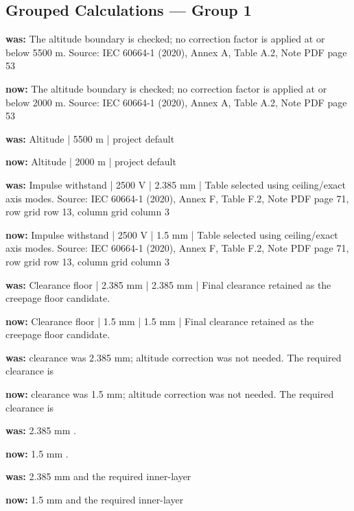 \documentclass[10pt]{article}
\begin{document}
\subsection*{Grouped Calculations — Group 1}
\textbf{was:} The altitude boundary is checked; no correction factor is applied at or below 5500 m. Source: IEC 60664-1 (2020), Annex A, Table A.2, Note PDF page 53\par
\textbf{now:} The altitude boundary is checked; no correction factor is applied at or below 2000 m. Source: IEC 60664-1 (2020), Annex A, Table A.2, Note PDF page 53\par
\textbf{was:} Altitude | 5500 m | project default\par
\textbf{now:} Altitude | 2000 m | project default\par
\textbf{was:} Impulse withstand | 2500 V | 2.385 mm | Table selected using ceiling/exact axis modes. Source: IEC 60664-1 (2020), Annex F, Table F.2, Note PDF page 71, row grid row 13, column grid column 3\par
\textbf{now:} Impulse withstand | 2500 V | 1.5 mm | Table selected using ceiling/exact axis modes. Source: IEC 60664-1 (2020), Annex F, Table F.2, Note PDF page 71, row grid row 13, column grid column 3\par
\textbf{was:} Clearance floor | 2.385 mm | 2.385 mm | Final clearance retained as the creepage floor candidate.\par
\textbf{now:} Clearance floor | 1.5 mm | 1.5 mm | Final clearance retained as the creepage floor candidate.\par
\textbf{was:} clearance was 2.385 mm; altitude correction was not needed. The required clearance is\par
\textbf{now:} clearance was 1.5 mm; altitude correction was not needed. The required clearance is\par
\textbf{was:} 2.385 mm .\par
\textbf{now:} 1.5 mm .\par
\textbf{was:} 2.385 mm and the required inner-layer\par
\textbf{now:} 1.5 mm and the required inner-layer\par
\end{document}
